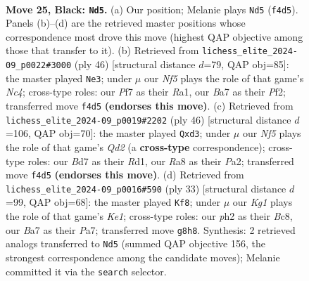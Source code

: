 \documentclass[11pt]{article}
\begin{document}
\clearpage

\begin{figure}[p]\centering
\begin{subfigure}{0.46\textwidth}\centering
\resizebox{\linewidth}{!}{%
\newchessgame
\chessboard[
  setfen={r3r1k1/bp1b1pp1/pq2p3/7P/3p1nQ1/BP5B/P2P1P1P/RN2RK2 b - - 2 25},
  showmover=false,
  pgfstyle=straightmove, color=movearrow, markmove={f4-d5}
]}
\caption{}
\end{subfigure}\hfill
\begin{subfigure}{0.46\textwidth}\centering
\resizebox{\linewidth}{!}{%
\newchessgame
\chessboard[
  setfen={brr3k1/4bpp1/2qp1n2/4p3/P1N1P3/2BQ1BPp/1P3P1P/R3R1K1 w - - 2 24},
  showmover=false,
  pgfstyle=straightmove, color=movearrow, markmove={c4-e3}
]}
\caption{}
\end{subfigure}
\\[4pt]
\begin{subfigure}{0.46\textwidth}\centering
\resizebox{\linewidth}{!}{%
\newchessgame
\chessboard[
  setfen={5rk1/1p1rb1pp/2nN2q1/p1P2p2/2P2P2/1P1pB3/P2Q2PP/3RR1K1 w - - 5 24},
  showmover=false,
  pgfstyle=straightmove, color=movearrow, markmove={d2-d3}
]}
\caption{}
\end{subfigure}\hfill
\begin{subfigure}{0.46\textwidth}\centering
\resizebox{\linewidth}{!}{%
\newchessgame
\chessboard[
  setfen={r1b1k2r/pp1q1pbp/2p5/3n2BQ/3PRNP1/1B6/PPP2P2/2K4R b kq - 0 17},
  showmover=false,
  pgfstyle=straightmove, color=movearrow, markmove={e8-f8}
]}
\caption{}
\end{subfigure}
\caption{\textbf{Move 25, Black: \texttt{Nd5}.} (a) Our position; Melanie plays \texttt{Nd5} (\texttt{f4d5}). Panels (b)--(d) are the retrieved master positions whose correspondence most drove this move (highest QAP objective among those that transfer to it). (b) Retrieved from \texttt{lichess\_elite\_2024-09\_p0022\#3000} (ply 46) [structural distance $d$=79, QAP obj=85]: the master played \texttt{Ne3}; under $\mu$ our \emph{Nf5} plays the role of that game's \emph{Nc4}; cross-type roles: our \emph{P}f7 as their \emph{R}a1, our \emph{B}a7 as their \emph{P}f2; transferred move \texttt{f4d5} \textbf{(endorses this move)}. (c) Retrieved from \texttt{lichess\_elite\_2024-09\_p0019\#2202} (ply 46) [structural distance $d$=106, QAP obj=70]: the master played \texttt{Qxd3}; under $\mu$ our \emph{Nf5} plays the role of that game's \emph{Qd2} (a \textbf{cross-type} correspondence); cross-type roles: our \emph{B}d7 as their \emph{R}d1, our \emph{R}a8 as their \emph{P}a2; transferred move \texttt{f4d5} \textbf{(endorses this move)}. (d) Retrieved from \texttt{lichess\_elite\_2024-09\_p0016\#590} (ply 33) [structural distance $d$=99, QAP obj=68]: the master played \texttt{Kf8}; under $\mu$ our \emph{Kg1} plays the role of that game's \emph{Ke1}; cross-type roles: our \emph{p}h2 as their \emph{B}c8, our \emph{B}a7 as their \emph{P}a7; transferred move \texttt{g8h8}. Synthesis: 2 retrieved analogs transferred to \texttt{Nd5} (summed QAP objective 156, the strongest correspondence among the candidate moves); Melanie committed it via the \texttt{search} selector.}
\label{fig:thought-m49}
\end{figure}
\end{document}
